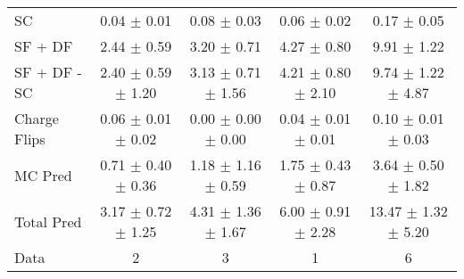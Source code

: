 \begin{tabular}{l|cccc}
                                 SC &  0.04 $\pm$  0.01 &  0.08 $\pm$  0.03 &  0.06 $\pm$  0.02 &  0.17 $\pm$  0.05 \\
                            SF + DF &  2.44 $\pm$  0.59 &  3.20 $\pm$  0.71 &  4.27 $\pm$  0.80 &  9.91 $\pm$  1.22 \\
\hline
                       SF + DF - SC &  2.40 $\pm$  0.59 $\pm$  1.20 &  3.13 $\pm$  0.71 $\pm$  1.56 &  4.21 $\pm$  0.80 $\pm$  2.10 &  9.74 $\pm$  1.22 $\pm$  4.87 \\
\hline\hline
                       Charge Flips &  0.06 $\pm$  0.01 $\pm$  0.02 &  0.00 $\pm$  0.00 $\pm$  0.00 &  0.04 $\pm$  0.01 $\pm$  0.01 &  0.10 $\pm$  0.01 $\pm$  0.03 \\
\hline
                            MC Pred &  0.71 $\pm$  0.40 $\pm$  0.36 &  1.18 $\pm$  1.16 $\pm$  0.59 &  1.75 $\pm$  0.43 $\pm$  0.87 &  3.64 $\pm$  0.50 $\pm$  1.82 \\
\hline
                         Total Pred &  3.17 $\pm$  0.72 $\pm$  1.25 &  4.31 $\pm$  1.36 $\pm$  1.67 &  6.00 $\pm$  0.91 $\pm$  2.28 & 13.47 $\pm$  1.32 $\pm$  5.20 \\
\hline\hline
                               Data &     2 &     3 &     1 &     6 \\
\hline\hline
\end{tabular}

